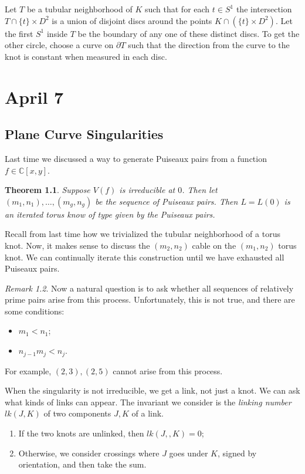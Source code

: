 \documentclass[leqno, openany]{memoir}
\newtheorem{thm}{Theorem}[chapter]
\theoremstyle{definition}
\theoremstyle{remark}
\newtheorem{rmk}[thm]{Remark}
\theoremstyle{plain}
\theoremstyle{definition}
\theoremstyle{remark}
\renewcommand{\C}{\mathbb{C}}
\begin{document}
Let $T$ be a tubular neighborhood of $K$ such that for each $t \in S^1$ the intersection $T \cap \{t \} \times D^2$ is a union of disjoint discs around the points $K \cap (\{ t \} \times D^2)$. Let the first $S^1$ inside $T$ be the boundary of any one of these distinct discs. To get the other circle, choose a curve on $\partial T$ such that the direction from the curve to the knot is constant when measured in each disc.

\chapter{April 7}%
\label{cha:april_7}

\section{Plane Curve Singularities}%
\label{sec:plane_curve_singularities}

Last time we discussed a way to generate Puiseaux pairs from a function $f \in \C[x,y]$.

\begin{thm}
    Suppose $V(f)$ is irreducible at $0$. Then let $(m_1, n_1), \ldots, (m_g, n_g)$ be the sequence of Puiseaux pairs. Then $L = L(0)$ is an iterated torus know of type given by the Puiseaux pairs.
\end{thm}

Recall from last time how we trivialized the tubular neighborhood of a torus knot. Now, it makes sense to discuss the $(m_2, n_2)$ cable on the $(m_1, n_2)$ torus knot. We can continually iterate this construction until we have exhausted all Puiseaux pairs. 

\begin{rmk}
    Now a natural question is to ask whether all sequences of relatively prime pairs arise from this process. Unfortunately, this is not true, and there are some conditions:
    \begin{itemize}
        \item $m_1 < n_1$;
        \item $n_{j-1}m_j < n_j$.
    \end{itemize}
    For example, $(2,3), (2,5)$ cannot arise from this process.
\end{rmk}

When the singularity is not irreducible, we get a link, not just a knot. We can ask what kinds of links can appear. The invariant we consider is the \textit{linking number} $lk(J,K)$ of two components $J,K$ of a link.
\begin{enumerate}
    \item If the two knots are unlinked, then $lk(J,,K) = 0$;
    \item Otherwise, we consider crossings where $J$ goes under $K$, signed by orientation, and then take the sum.
\end{enumerate}
\end{document}
